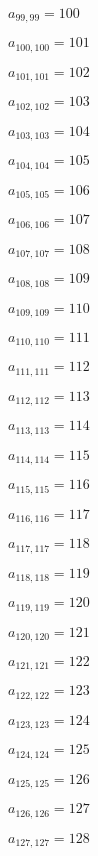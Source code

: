 \documentclass[a4paper,12pt]{article}
\begin{document}
$a _{ 99, 99 } = 100$

$a _{ 100, 100 } = 101$

$a _{ 101, 101 } = 102$

$a _{ 102, 102 } = 103$

$a _{ 103, 103 } = 104$

$a _{ 104, 104 } = 105$

$a _{ 105, 105 } = 106$

$a _{ 106, 106 } = 107$

$a _{ 107, 107 } = 108$

$a _{ 108, 108 } = 109$

$a _{ 109, 109 } = 110$

$a _{ 110, 110 } = 111$

$a _{ 111, 111 } = 112$

$a _{ 112, 112 } = 113$

$a _{ 113, 113 } = 114$

$a _{ 114, 114 } = 115$

$a _{ 115, 115 } = 116$

$a _{ 116, 116 } = 117$

$a _{ 117, 117 } = 118$

$a _{ 118, 118 } = 119$

$a _{ 119, 119 } = 120$

$a _{ 120, 120 } = 121$

$a _{ 121, 121 } = 122$

$a _{ 122, 122 } = 123$

$a _{ 123, 123 } = 124$

$a _{ 124, 124 } = 125$

$a _{ 125, 125 } = 126$

$a _{ 126, 126 } = 127$

$a _{ 127, 127 } = 128$
\end{document}
